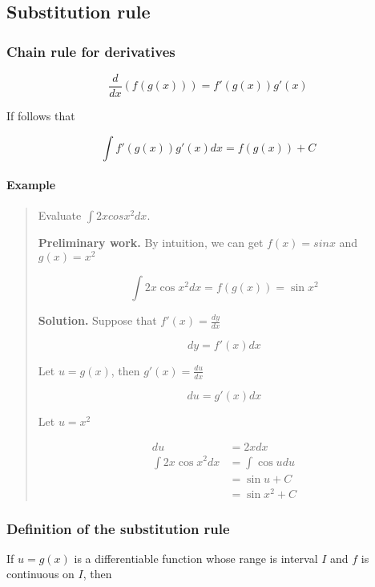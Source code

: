 \documentclass[
]{article}
\begin{document}
\hypertarget{substitution-rule}{%
\subsection{Substitution rule}\label{substitution-rule}}

\hypertarget{chain-rule-for-derivatives}{%
\subsubsection{Chain rule for
derivatives}\label{chain-rule-for-derivatives}}

\[ \frac{d}{dx}(f(g(x)))=f'(g(x))g'(x) \]

If follows that

\[ \int f'(g(x))g'(x)dx = f(g(x))+C \]

\hypertarget{example-2}{%
\paragraph{Example}\label{example-2}}

\begin{quote}
Evaluate \(\int 2xcosx^2dx\).

\textbf{Preliminary work.} By intuition, we can get \(f(x)=sinx\) and
\(g(x)=x^2\)

\[ \int 2x\cos x^2dx = f(g(x)) = \sin x^2 \]

\textbf{Solution.} Suppose that \(f'(x)=\frac{dy}{dx}\)

\[ dy = f'(x)dx \]

Let \(u=g(x)\), then \(g'(x)=\frac{du}{dx}\)

\[ du = g'(x)dx \]

Let \(u=x^2\)

\begin{align*}
du &=2xdx\\
 \int 2x\cos x^2dx &= \int \cos udu\\
 &=\sin u+C \\
 &=\sin x^2+C
\end{align*}
\end{quote}

\hypertarget{definition-of-the-substitution-rule}{%
\subsubsection{Definition of the substitution
rule}\label{definition-of-the-substitution-rule}}

If \(u=g(x)\) is a differentiable function whose range is interval \(I\)
and \(f\) is continuous on \(I\), then
\end{document}
